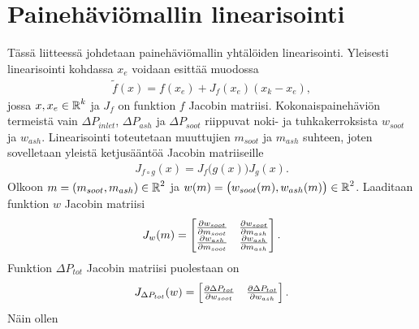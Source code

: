 
\chapter{Painehäviömallin linearisointi}%
\label{ch:linearisointi}

Tässä liitteessä johdetaan painehäviömallin yhtälöiden linearisointi. Yleisesti linearisointi kohdassa \(x_e\) voidaan esittää muodossa
\begin{align}
    \tilde{f}(x) = f(x_e) +J_f (x_e) (x_k-x_e),
\end{align}
jossa \(x, x_e \in \operatorname{\mathbb{R}}^k\) ja \(J_f\) on funktion \(f\) Jacobin matriisi. 
Kokonaispainehäviön termeistä vain \(\Delta P_{inlet}\), \(\Delta P_{ash}\) ja \(\Delta P_{soot}\) riippuvat noki- ja tuhkakerroksista \(w_{soot}\) ja \(w_{ash}\). 
Linearisointi toteutetaan muuttujien \(m_{soot}\) ja \( m_{ash}\) suhteen, joten
sovelletaan yleistä ketjusääntöä Jacobin matriiseille
\begin{align}
    J_{f \circ g}(x) = J_f\big(g(x)\big)  J_g(x).
\end{align}
Olkoon \(m = \left(m_{soot}, m_{ash}\right) \in \operatorname{\mathbb{R}}^2\) ja \(w(m) = \big(w_{soot}(m), w_{ash}(m)  \big) \in \operatorname{\mathbb{R}}^2\). Laaditaan funktion \(w\) Jacobin matriisi
\begin{align}
    J_w(m)=
    \begin{bmatrix} 
        \frac{\partial w_{soot}}{\partial m_{soot}} & \frac{\partial w_{soot}}{\partial m_{ash}}
    \\  \frac{\partial w_{ash}}{\partial m_{soot}} & \frac{\partial w_{ash}}{\partial m_{ash}}
     \end{bmatrix}.
\end{align}
 Funktion \(\Delta P_{tot}\) Jacobin matriisi puolestaan on 
\begin{align}
    J_{\Delta P_{tot}}(w) = \begin{bmatrix}   \frac{\partial \Delta P_{tot}}{\partial w_{soot}}
    &   \frac{\partial \Delta P_{tot}}{\partial w_{ash}}
     \end{bmatrix}.
\end{align}
Näin ollen 
